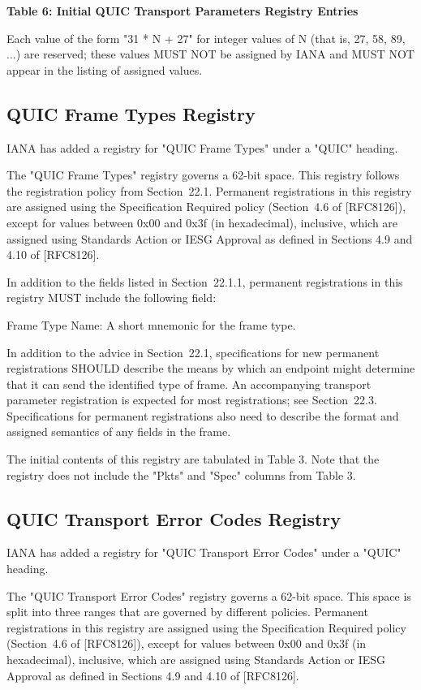 \documentclass{article}
\begin{document}
\begin{center}
\textbf{Table 6: Initial QUIC Transport Parameters Registry Entries}
\end{center}

Each value of the form "31 * N + 27" for integer values of N (that is, 27, 58, 89, ...) are reserved; these values MUST NOT be assigned by IANA and MUST NOT appear in the listing of assigned values.

\subsection{QUIC Frame Types Registry}

IANA has added a registry for "QUIC Frame Types" under a "QUIC" heading.

The "QUIC Frame Types" registry governs a 62-bit space.  This registry follows the registration policy from Section~22.1. Permanent registrations in this registry are assigned using the Specification Required policy (Section~4.6 of [RFC8126]), except for values between 0x00 and 0x3f (in hexadecimal), inclusive, which are assigned using Standards Action or IESG Approval as defined in Sections 4.9 and 4.10 of [RFC8126].

In addition to the fields listed in Section~22.1.1, permanent registrations in this registry MUST include the following field:

Frame Type Name:  A short mnemonic for the frame type.

In addition to the advice in Section~22.1, specifications for new permanent registrations SHOULD describe the means by which an endpoint might determine that it can send the identified type of frame.  An accompanying transport parameter registration is expected for most registrations; see Section~22.3.  Specifications for permanent registrations also need to describe the format and assigned semantics of any fields in the frame.

The initial contents of this registry are tabulated in Table 3.  Note that the registry does not include the "Pkts" and "Spec" columns from Table 3.

\subsection{QUIC Transport Error Codes Registry}

IANA has added a registry for "QUIC Transport Error Codes" under a "QUIC" heading.

The "QUIC Transport Error Codes" registry governs a 62-bit space. This space is split into three ranges that are governed by different policies.  Permanent registrations in this registry are assigned using the Specification Required policy (Section~4.6 of [RFC8126]), except for values between 0x00 and 0x3f (in hexadecimal), inclusive, which are assigned using Standards Action or IESG Approval as defined in Sections 4.9 and 4.10 of [RFC8126].
\end{document}
